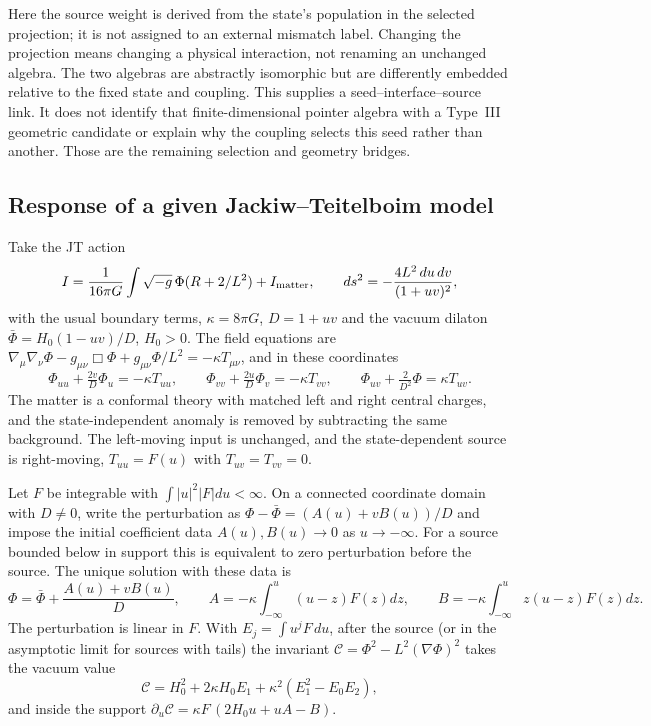 Here the source weight is derived from the state's population in the selected
projection; it is not assigned to an external mismatch label. Changing the projection
means changing a physical interaction, not renaming an unchanged algebra. The two
algebras are abstractly isomorphic but are differently embedded relative to the fixed
state and coupling. This supplies a seed--interface--source link. It does not identify
that finite-dimensional pointer algebra with a Type~III geometric candidate or explain
why the coupling selects this seed rather than another. Those are the remaining
selection and geometry bridges.


\subsection{Response of a given Jackiw--Teitelboim model}
\label{sec:jt}

Take the JT action~\cite{AlmheiriPolchinski2015,Moitra2020}
\begin{equation}
I=\frac1{16\pi G}\int\sqrt{-g}\,\Phi(R+2/L^2)+I_{\rm matter},\qquad
ds^2=-\frac{4L^2\,du\,dv}{(1+uv)^2},
\end{equation}
with the usual boundary terms, $\kappa=8\pi G$, $D=1+uv$ and the vacuum dilaton $\bar\Phi=H_0(1-uv)/D$, $H_0>0$. The field equations are $\nabla_\mu\nabla_\nu\Phi-g_{\mu\nu}\Box\Phi+g_{\mu\nu}\Phi/L^2=-\kappa T_{\mu\nu}$, and in these coordinates
\begin{equation}
\Phi_{uu}+\tfrac{2v}D\Phi_u=-\kappa T_{uu},\qquad
\Phi_{vv}+\tfrac{2u}D\Phi_v=-\kappa T_{vv},\qquad
\Phi_{uv}+\tfrac{2}{D^2}\Phi=\kappa T_{uv} .
\label{eq:jt}
\end{equation}
The matter is a conformal theory with matched left and right central charges, and the state-independent anomaly is removed by subtracting the same background. The left-moving input is unchanged, and the state-dependent source is right-moving, $T_{uu}=F(u)$ with $T_{uv}=T_{vv}=0$.

\begin{proposition}
\label{prop:jt}
Let $F$ be integrable with $\int|u|^2|F|du<\infty$. On a connected coordinate domain with $D\ne0$, write the perturbation as $\Phi-\bar\Phi=(A(u)+vB(u))/D$ and impose the initial coefficient data $A(u),B(u)\to0$ as $u\to-\infty$. For a source bounded below in support this is equivalent to zero perturbation before the source. The unique solution with these data is
\begin{equation}
\Phi=\bar\Phi+\frac{A(u)+vB(u)}D,\qquad
A=-\kappa\int_{-\infty}^{u}(u-z)F(z)dz,\qquad
B=-\kappa\int_{-\infty}^{u}z(u-z)F(z)dz .
\label{eq:retarded}
\end{equation}
The perturbation is linear in $F$. With $E_j=\int u^jF\,du$, after the source (or in the asymptotic limit for sources with tails) the invariant $\mathcal C=\Phi^2-L^2(\nabla\Phi)^2$ takes the vacuum value
\begin{equation}
\mathcal C=H_0^2+2\kappa H_0E_1+\kappa^2(E_1^2-E_0E_2),
\label{eq:invariant}
\end{equation}
and inside the support $\partial_u\mathcal C=\kappa F\,(2H_0u+uA-B)$.
\end{proposition}

